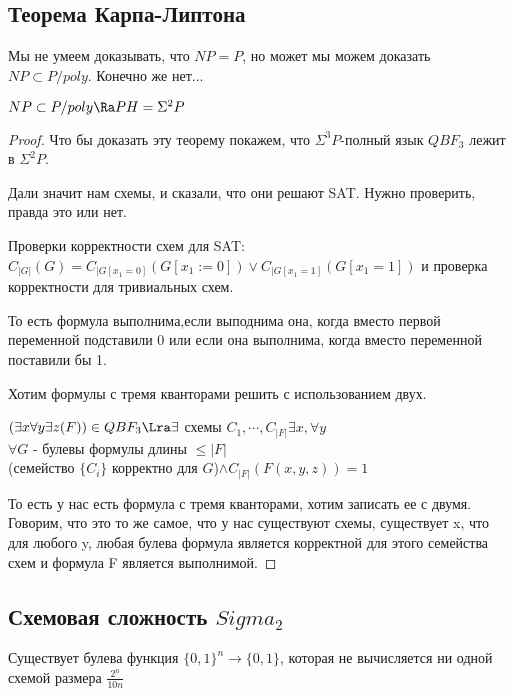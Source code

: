 \subsection{Теорема Карпа-Липтона}

Мы не умеем доказывать, что $NP = P$, но может мы можем доказать $NP \subset P/poly$. Конечно же нет...

\begin{theorem}
	$NP \subset P/poly \Ra PH = \Sigma^2P$\\
\end{theorem}
\begin{proof}
	Что бы доказать эту теорему покажем, что $\Sigma^3P$-полный язык $QBF_3$ лежит в $\Sigma^2P$.

	Дали значит нам схемы, и сказали, что они решают SAT. Нужно проверить, правда это или нет. 

	Проверки корректности схем для SAT:
	$C_{|G|}(G) = C_{|G[x_1 = 0]}(G[x_1:= 0]) \vee C_{|G[x_1 = 1]}(G[x_1 = 1])$ и проверка корректности для тривиальных схем.

	То есть формула выполнима,если выподнима она, когда вместо первой переменной подставили 0 или если она выполнима, когда вместо переменной 
	поставили бы 1. 

	Хотим формулы с тремя кванторами решить с использованием двух.
	
	$(\exists x \forall y \exists z (F)) \in QBF_3 \Lra
	\exists$ схемы $C_1, \cdots, C_{|F|} \exists x, \forall y$\\
	$\forall G$ - булевы формулы длины $\le |F|$\\
	(семейство $\{C_i\}$ корректно для $G$)$\wedge C_{|F|}(F(x,y,z)) = 1$

        То есть у нас есть формула с тремя кванторами, хотим записать ее с двумя. 
        Говорим, что это то же самое, что у нас существуют схемы, существует x, 
        что для любого y, любая булева формула является корректной для этого семейства схем и 
        формула F является выполнимой. 
\end{proof}

\subsection{Схемовая сложность $Sigma_2$}
\begin{theorem}
	Существует булева функция $\{0, 1\}^{n} \to \{0, 1\}$, 
	которая не вычисляется ни одной схемой размера $\frac{2^n}{10n}$
\end{theorem}

